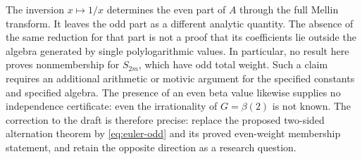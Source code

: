 The inversion \(x\mapsto1/x\) determines the even part of \(A\)
through the full Mellin transform. It leaves the odd part as a
different analytic quantity. The absence of the same reduction for
that part is not a proof that its coefficients lie outside the algebra
generated by single polylogarithmic values. In particular, no result
here proves nonmembership for \(S_{2m}\), which have odd total
weight. Such a claim requires an additional arithmetic or motivic
argument for the specified constants and specified algebra. The
presence of an even beta value likewise supplies no independence
certificate: even the irrationality of \(G=\beta(2)\) is not known.
The correction to the draft is therefore precise: replace the proposed
two-sided alternation theorem by \eqref{eq:euler-odd} and its proved
even-weight membership statement, and retain the opposite direction
as a research question.
